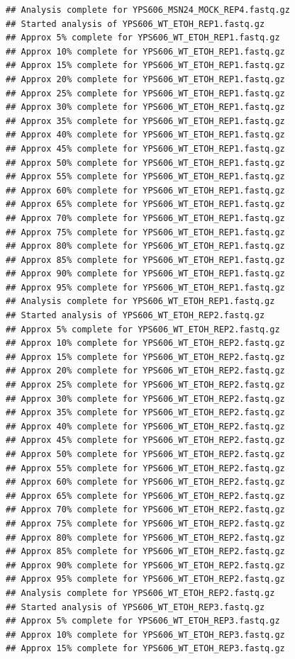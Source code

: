 \documentclass[
]{book}
\begin{document}
\begin{verbatim}
## Analysis complete for YPS606_MSN24_MOCK_REP4.fastq.gz
## Started analysis of YPS606_WT_ETOH_REP1.fastq.gz
## Approx 5% complete for YPS606_WT_ETOH_REP1.fastq.gz
## Approx 10% complete for YPS606_WT_ETOH_REP1.fastq.gz
## Approx 15% complete for YPS606_WT_ETOH_REP1.fastq.gz
## Approx 20% complete for YPS606_WT_ETOH_REP1.fastq.gz
## Approx 25% complete for YPS606_WT_ETOH_REP1.fastq.gz
## Approx 30% complete for YPS606_WT_ETOH_REP1.fastq.gz
## Approx 35% complete for YPS606_WT_ETOH_REP1.fastq.gz
## Approx 40% complete for YPS606_WT_ETOH_REP1.fastq.gz
## Approx 45% complete for YPS606_WT_ETOH_REP1.fastq.gz
## Approx 50% complete for YPS606_WT_ETOH_REP1.fastq.gz
## Approx 55% complete for YPS606_WT_ETOH_REP1.fastq.gz
## Approx 60% complete for YPS606_WT_ETOH_REP1.fastq.gz
## Approx 65% complete for YPS606_WT_ETOH_REP1.fastq.gz
## Approx 70% complete for YPS606_WT_ETOH_REP1.fastq.gz
## Approx 75% complete for YPS606_WT_ETOH_REP1.fastq.gz
## Approx 80% complete for YPS606_WT_ETOH_REP1.fastq.gz
## Approx 85% complete for YPS606_WT_ETOH_REP1.fastq.gz
## Approx 90% complete for YPS606_WT_ETOH_REP1.fastq.gz
## Approx 95% complete for YPS606_WT_ETOH_REP1.fastq.gz
## Analysis complete for YPS606_WT_ETOH_REP1.fastq.gz
## Started analysis of YPS606_WT_ETOH_REP2.fastq.gz
## Approx 5% complete for YPS606_WT_ETOH_REP2.fastq.gz
## Approx 10% complete for YPS606_WT_ETOH_REP2.fastq.gz
## Approx 15% complete for YPS606_WT_ETOH_REP2.fastq.gz
## Approx 20% complete for YPS606_WT_ETOH_REP2.fastq.gz
## Approx 25% complete for YPS606_WT_ETOH_REP2.fastq.gz
## Approx 30% complete for YPS606_WT_ETOH_REP2.fastq.gz
## Approx 35% complete for YPS606_WT_ETOH_REP2.fastq.gz
## Approx 40% complete for YPS606_WT_ETOH_REP2.fastq.gz
## Approx 45% complete for YPS606_WT_ETOH_REP2.fastq.gz
## Approx 50% complete for YPS606_WT_ETOH_REP2.fastq.gz
## Approx 55% complete for YPS606_WT_ETOH_REP2.fastq.gz
## Approx 60% complete for YPS606_WT_ETOH_REP2.fastq.gz
## Approx 65% complete for YPS606_WT_ETOH_REP2.fastq.gz
## Approx 70% complete for YPS606_WT_ETOH_REP2.fastq.gz
## Approx 75% complete for YPS606_WT_ETOH_REP2.fastq.gz
## Approx 80% complete for YPS606_WT_ETOH_REP2.fastq.gz
## Approx 85% complete for YPS606_WT_ETOH_REP2.fastq.gz
## Approx 90% complete for YPS606_WT_ETOH_REP2.fastq.gz
## Approx 95% complete for YPS606_WT_ETOH_REP2.fastq.gz
## Analysis complete for YPS606_WT_ETOH_REP2.fastq.gz
## Started analysis of YPS606_WT_ETOH_REP3.fastq.gz
## Approx 5% complete for YPS606_WT_ETOH_REP3.fastq.gz
## Approx 10% complete for YPS606_WT_ETOH_REP3.fastq.gz
## Approx 15% complete for YPS606_WT_ETOH_REP3.fastq.gz

\end{verbatim}
\end{document}
